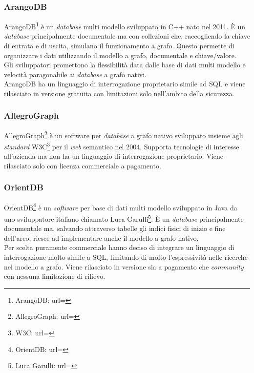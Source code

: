 \subsubsection{ArangoDB}
ArangoDB\footnote{ArangoDB: url= } è un \textit{database} multi modello sviluppato in C++ nato nel 2011. È un \textit{database} principalmente documentale ma con collezioni che, raccogliendo la chiave di entrata e di uscita, simulano il funzionamento a grafo. Questo permette di organizzare i dati utilizzando il modello a grafo, documentale e chiave/valore.\\
Gli sviluppatori promettono la flessibilità data dalle base di dati multi modello e velocità paragonabile ai \textit{database} a grafo nativi.\\
ArangoDB ha un linguaggio di interrogazione proprietario simile ad \gls{SQL} e viene rilasciato in versione gratuita con limitazioni solo nell'ambito della sicurezza.
\subsubsection{AllegroGraph}
AllegroGraph\footnote{AllegroGraph: url= } è un software per \textit{database} a grafo nativo sviluppato insieme agli \textit{standard} W3C\footnote{W3C: url= } per il \textit{web} \gls{semantico}  nel 2004. Supporta tecnologie di interesse all'azienda ma non ha un linguaggio di interrogazione proprietario. Viene rilasciato solo con licenza commerciale a pagamento.
\subsubsection{OrientDB}
OrientDB\footnote{OrientDB: url= } è un \textit{software} per base di dati multi modello sviluppato in Java da uno sviluppatore italiano chiamato Luca Garulli\footnote{Luca Garulli: url= }. È un \textit{database} principalmente documentale ma, salvando attraverso tabelle gli indici fisici di inizio e fine dell'arco, riesce ad implementare anche il modello a grafo nativo. \\
Per scelta puramente commerciale hanno deciso di integrare un linguaggio di interrogazione molto simile a \gls{SQL}, limitando di molto l'espressività nelle ricerche nel modello a grafo. Viene rilasciato in versione sia a pagamento che \textit{community} con nessuna limitazione di rilievo.
